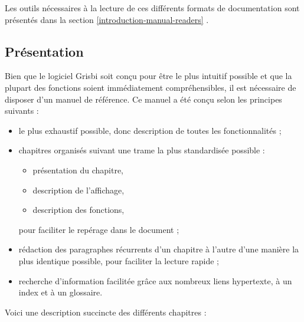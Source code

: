 Les outils nécessaires à la lecture de ces différents formats de documentation sont présentés dans la section \vref{introduction-manual-readers} .


\subsection{Présentation\label{introduction-manual-presentation}}

Bien que le logiciel Grisbi soit conçu pour être le plus intuitif possible et que la plupart des fonctions soient immédiatement compréhensibles, il est nécessaire de disposer d'un manuel de référence. Ce manuel a été conçu selon les principes suivants :

\begin{itemize} 
	\item le plus exhaustif possible, donc description de toutes les fonctionnalités ;
	\item chapitres organisés suivant une trame la plus standardisée possible :
		\begin{itemize}
		\item présentation du chapitre,
		\item description de l'affichage,
		\item description des fonctions,
		\end{itemize}
	pour faciliter le repérage dans le document ;
	\item rédaction des paragraphes récurrents d'un chapitre à l'autre d'une manière la plus identique possible, pour faciliter la lecture rapide ;
	\item recherche d'information facilitée grâce aux nombreux \gls{liens hypertexte}, à un index et à un glossaire.
\end{itemize}

Voici une description succincte des différents chapitres :

